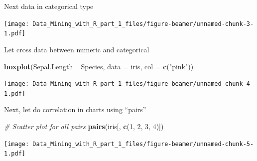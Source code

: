 \documentclass[ignorenonframetext,]{beamer}
\newenvironment{Shaded}{\begin{snugshade}}{\end{snugshade}}
\newcommand{\KeywordTok}[1]{\textcolor[rgb]{0.13,0.29,0.53}{\textbf{{#1}}}}
\newcommand{\DataTypeTok}[1]{\textcolor[rgb]{0.13,0.29,0.53}{{#1}}}
\newcommand{\DecValTok}[1]{\textcolor[rgb]{0.00,0.00,0.81}{{#1}}}
\newcommand{\StringTok}[1]{\textcolor[rgb]{0.31,0.60,0.02}{{#1}}}
\newcommand{\CommentTok}[1]{\textcolor[rgb]{0.56,0.35,0.01}{\textit{{#1}}}}
\newcommand{\NormalTok}[1]{{#1}}
\begin{document}
\begin{frame}[fragile]{}

Next data in categorical type

\begin{Shaded}
\end{Shaded}

\texttt{[image: Data\_Mining\_with\_R\_part\_1\_files/figure-beamer/unnamed-chunk-3-1.pdf]}

\end{frame}

\begin{frame}[fragile]{}

Let cross data between numeric and categorical

\begin{Shaded}
\begin{Highlighting}[]
\KeywordTok{boxplot}\NormalTok{(Sepal.Length ~}\StringTok{ }\NormalTok{Species, }\DataTypeTok{data =} \NormalTok{iris, }\DataTypeTok{col =} \KeywordTok{c}\NormalTok{(}\StringTok{"pink"}\NormalTok{))}
\end{Highlighting}
\end{Shaded}

\texttt{[image: Data\_Mining\_with\_R\_part\_1\_files/figure-beamer/unnamed-chunk-4-1.pdf]}

\end{frame}

\begin{frame}[fragile]{}

Next, let do correlation in charts using ``pairs''

\begin{Shaded}
\begin{Highlighting}[]
\CommentTok{# Scatter plot for all pairs}
\KeywordTok{pairs}\NormalTok{(iris[, }\KeywordTok{c}\NormalTok{(}\DecValTok{1}\NormalTok{, }\DecValTok{2}\NormalTok{, }\DecValTok{3}\NormalTok{, }\DecValTok{4}\NormalTok{)])}
\end{Highlighting}
\end{Shaded}

\texttt{[image: Data\_Mining\_with\_R\_part\_1\_files/figure-beamer/unnamed-chunk-5-1.pdf]}

\end{frame}
\end{document}
